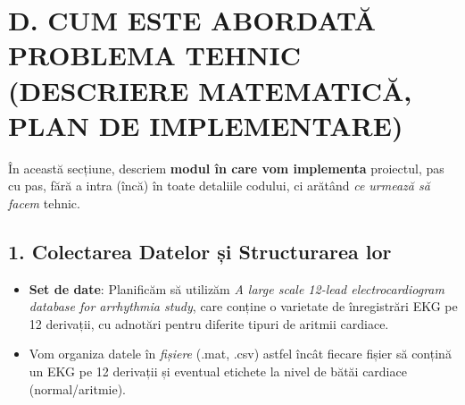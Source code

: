 \documentclass[12pt]{article}
\begin{document}
\section{D. CUM ESTE ABORDATĂ PROBLEMA TEHNIC (DESCRIERE MATEMATICĂ, PLAN DE IMPLEMENTARE)}

În această secțiune, descriem \textbf{modul în care vom implementa} proiectul, pas cu pas, fără a intra (încă) în toate detaliile codului, ci arătând \emph{ce urmează să facem} tehnic.

\subsection*{1. Colectarea Datelor și Structurarea lor}
\begin{itemize}
    \item \textbf{Set de date}: Planificăm să utilizăm \emph{A large scale 12-lead electrocardiogram database for arrhythmia study}, care conține o varietate de înregistrări EKG pe 12 derivații, cu adnotări pentru diferite tipuri de aritmii cardiace.
    \item Vom organiza datele în \emph{fișiere} (.mat, .csv) astfel încât fiecare fișier să conțină un EKG pe 12 derivații și eventual etichete la nivel de bătăi cardiace (normal/aritmie).
\end{itemize}
\end{document}

